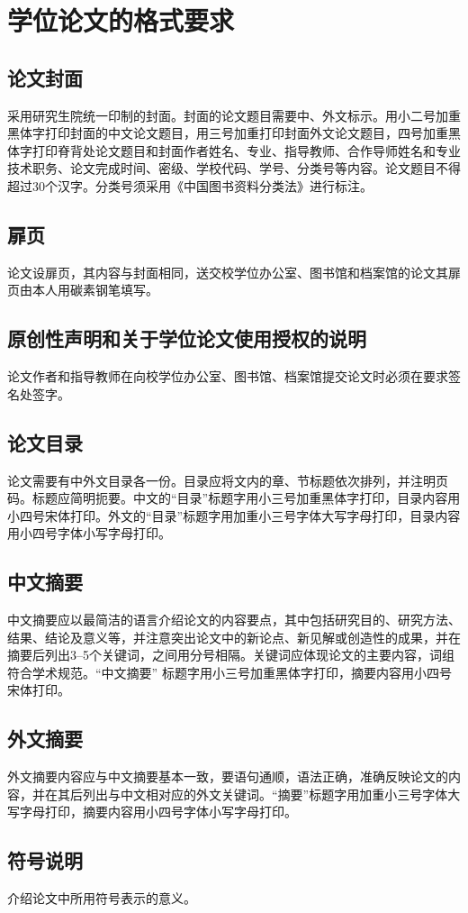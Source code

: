 \section{学位论文的格式要求}
\subsection{论文封面}
采用研究生院统一印制的封面。封面的论文题目需要中、外文标示。用小二号加重黑体字打印封面的中文论文题目，用三号加重打印封面外文论文题目，四号加重黑体字打印脊背处论文题目和封面作者姓名、专业、指导教师、合作导师姓名和专业技术职务、论文完成时间、密级、学校代码、学号、分类号等内容。论文题目不得超过30个汉字。分类号须采用《中国图书资料分类法》进行标注。
\subsection{扉页}
论文设扉页，其内容与封面相同，送交校学位办公室、图书馆和档案馆的论文其扉页由本人用碳素钢笔填写。
\subsection{原创性声明和关于学位论文使用授权的说明}
论文作者和指导教师在向校学位办公室、图书馆、档案馆提交论文时必须在要求签名处签字。
\subsection{论文目录}
论文需要有中外文目录各一份。目录应将文内的章、节标题依次排列，并注明页码。标题应简明扼要。中文的“目录”标题字用小三号加重黑体字打印，目录内容用小四号宋体打印。外文的“目录”标题字用加重小三号字体大写字母打印，目录内容用小四号字体小写字母打印。
\subsection{中文摘要}
中文摘要应以最简洁的语言介绍论文的内容要点，其中包括研究目的、研究方法、结果、结论及意义等，并注意突出论文中的新论点、新见解或创造性的成果，并在摘要后列出3--5个关键词，之间用分号相隔。关键词应体现论文的主要内容，词组符合学术规范。“中文摘要” 标题字用小三号加重黑体字打印，摘要内容用小四号宋体打印。
\subsection{外文摘要}
外文摘要内容应与中文摘要基本一致，要语句通顺，语法正确，准确反映论文的内容，并在其后列出与中文相对应的外文关键词。“摘要”标题字用加重小三号字体大写字母打印，摘要内容用小四号字体小写字母打印。
\subsection{符号说明}
介绍论文中所用符号表示的意义。
